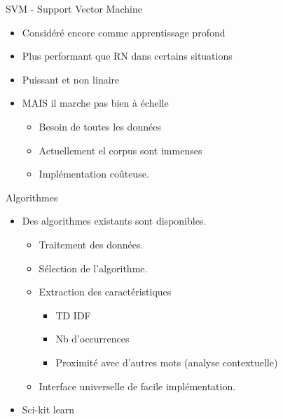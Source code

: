 \documentclass[aspectratio=169,xcolor=dvipsnames, t]{beamer}
\begin{document}

\begin{frame}{SVM - Support Vector Machine}
	\begin{itemize}
		\item Considéré encore comme apprentissage profond 
		\item Plus performant que RN dans certains situations
		\item Puissant et non linaire
		\item MAIS il marche pas bien à échelle
		\begin{itemize}
			\item Besoin de toutes les données
			\item Actuellement el corpus sont immenses
			\item Implémentation coûteuse. 
		\end{itemize}
	\end{itemize}
\end{frame}

\begin{frame}{Algorithmes}
	\begin{itemize}
		\item Des algorithmes existants sont disponibles.
		\begin{itemize}
			\item Traitement des données.
			\item Sélection de l'algorithme.
			\item Extraction des caractéristiques
			\begin{itemize}
				\item TD IDF
				\item Nb d'occurrences
				\item Proximité avec d'autres mots (analyse contextuelle)
			\end{itemize}
			\item Interface universelle de facile implémentation.
		\end{itemize} 
		\item Sci-kit learn
	\end{itemize}
	
\end{frame}
\end{document}
